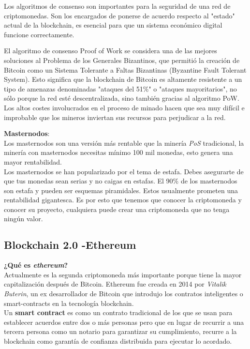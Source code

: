 \documentclass[a4paper,12pt]{lib/pub}
\begin{document}
Los algoritmos de consenso son importantes para la seguridad de una red de criptomonedas. Son los encargados de ponerse de acuerdo respecto al "estado" actual de la blockchain, es esencial para que un sistema económico digital funcione correctamente. 

El algoritmo de consenso Proof of Work se considera una de las mejores soluciones al Problema de los Generales Bizantinos, que permitió la creación de Bitcoin como un Sistema Tolerante a Faltas Bizantinas (Byzantine Fault Tolerant System). Esto significa que la blockchain de Bitcoin es altamente resistente a un tipo de amenazas denominadas "ataques del 51\%" o "ataques mayoritarios", no sólo porque la red esté descentralizada, sino también gracias al algoritmo PoW. Los altos costes involucrados en el proceso de minado hacen que sea muy difícil e improbable que los mineros inviertan sus recursos para perjudicar a la red.

\textbf{Masternodos}:\\
Los masternodos son una versión más rentable que la minería \textit{PoS} tradicional, la minería con masternodos necesitas mínimo 100 mil monedas, esto genera una mayor rentabilidad.\\
Los masternodos se han popularizado por el tema de estafa. Debes asegurarte de que tus monedas sean serias y no caigas en estafas. El 90\% de los masternodos son estafa y pueden ser esquemas piramidales. Estos usualmente prometen una rentabilidad gigantesca. Es por esto que tenemos que conocer la criptomoneda y conocer su proyecto, cualquiera puede crear una criptomoneda que no tenga ningún valor.
\subsection{Blockchain 2.0 -Ethereum}
\textbf{¿Qué es \textit{ethereum}?}\\

Actualmente es la segunda criptomoneda más importante porque tiene la mayor capitalización después de Bitcoin.
Ethereum fue creada en 2014 por \textit{Vitalik Buterin}, un ex desarrollador de Bitcoin que introdujo los contratos inteligentes o smart-contracts en la tecnología blockchain.\\

Un \textbf{smart contract} es como un contrato tradicional de los que se usan para establecer acuerdos entre dos o más personas pero que en lugar de recurrir a una tercera persona como un notario para garantizar su cumplimiento, recurre a la blockchain como garantía de confianza distribuida para ejecutar lo acordado.
\end{document}
